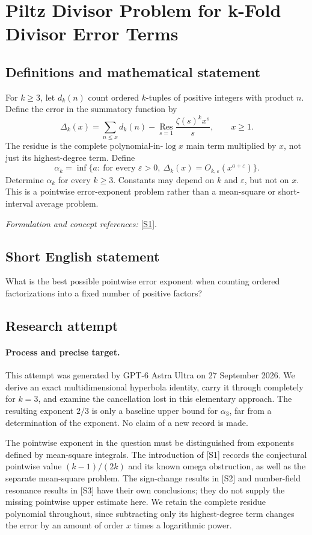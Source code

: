 \documentclass[11pt]{article}
\begin{document}
\section*{\texorpdfstring{Piltz Divisor Problem for k-Fold Divisor Error Terms}{Piltz Divisor Problem for k-Fold Divisor Error Terms}}\label{438}
\subsection{Definitions and mathematical statement}
For $k\ge3$, let $d_k(n)$ count ordered $k$-tuples of positive integers with product $n$. Define the error in the summatory function by
\[
 \Delta_k(x)=\sum_{n\le x}d_k(n)
 -\operatorname*{Res}_{s=1}\frac{\zeta(s)^k x^s}{s},\qquad x\ge1.
\]
The residue is the complete polynomial-in-$\log x$ main term multiplied by $x$, not just its highest-degree term. Define
\[
 \alpha_k=\inf\{a:\ \text{for every }{\varepsilon}>0,
 \ \Delta_k(x)=O_{k,{\varepsilon}}(x^{a+{\varepsilon}})\}.
\]
Determine $\alpha_k$ for every $k\ge3$. Constants may depend on $k$ and ${\varepsilon}$, but not on $x$. This is a pointwise error-exponent problem rather than a mean-square or short-interval average problem.
\par\smallskip\textit{Formulation and concept references:} \href{https://arxiv.org/html/2303.05028}{[S1]}.

\subsection{Short English statement}
What is the best possible pointwise error exponent when counting ordered factorizations into a fixed number of positive factors?
\subsection{Research attempt}
\paragraph{Process and precise target.}
This attempt was generated by GPT-6 Astra Ultra on 27 September 2026. We derive an exact multidimensional hyperbola identity, carry it through completely for $k=3$, and examine the cancellation lost in this elementary approach. The resulting exponent $2/3$ is only a baseline upper bound for $\alpha_3$, far from a determination of the exponent. No claim of a new record is made.

The pointwise exponent in the question must be distinguished from exponents defined by mean-square integrals. The introduction of [S1] records the conjectural pointwise value $(k-1)/(2k)$ and its known omega obstruction, as well as the separate mean-square problem. The sign-change results in [S2] and number-field resonance results in [S3] have their own conclusions; they do not supply the missing pointwise upper estimate here. We retain the complete residue polynomial throughout, since subtracting only its highest-degree term changes the error by an amount of order $x$ times a logarithmic power.
\end{document}
